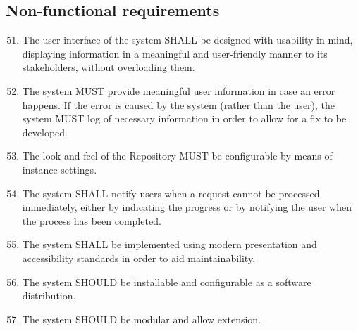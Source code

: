 \subsection{Non-functional requirements}
\label{nonFunctionalRequirements}
\begin{enumerate}[1]
\setcounter{enumi}{50}

\item The user interface of the system SHALL be designed with usability in mind, displaying information in a meaningful and user-friendly manner to its stakeholders, without overloading them.

\item The system MUST provide meaningful user information in case an error happens. If the error is caused by the system (rather than the user), the system MUST log of necessary information in order to allow for a fix to be developed.

\item The look and feel of the Repository MUST be configurable by means of instance settings.

\item The system SHALL notify users when a request cannot be processed immediately, either by indicating the progress or by notifying the user when the process has been completed.

\item The system SHALL be implemented using modern presentation and accessibility standards in order to aid maintainability.

\item The system SHOULD be installable and configurable as a software distribution.

\item The system SHOULD be modular and allow extension.
\end{enumerate}

